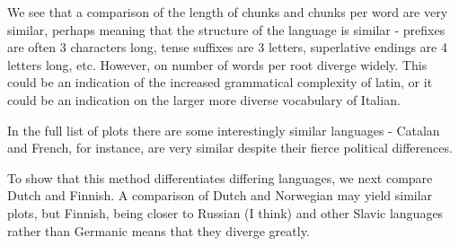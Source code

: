 \documentclass{article}
\begin{document}
We see that a comparison of the length of chunks and chunks per word are very similar, perhaps meaning that the structure of the language is similar - prefixes are often 3 characters long, tense suffixes are 3 letters, superlative endings are 4 letters long, etc. However, on number of words per root diverge widely. This could be an indication of the increased grammatical complexity of latin, or it could be an indication on the larger more diverse vocabulary of Italian. 

In the full list of plots there are some interestingly similar languages - Catalan and French, for instance, are very similar despite their fierce political differences. 

To show that this method differentiates differing languages, we next compare Dutch and Finnish. A comparison of Dutch and Norwegian may yield similar plots, but Finnish, being closer to Russian (I think) and other Slavic languages rather than Germanic means that they diverge greatly. 
\end{document}
